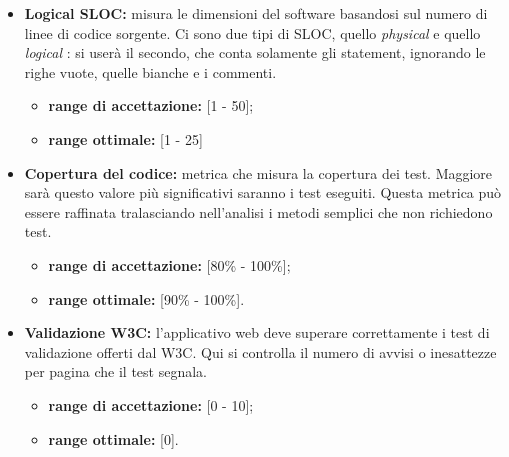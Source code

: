 \begin{itemize}
				\item \textbf{Logical SLOC:} misura le dimensioni del software basandosi sul numero di linee di codice sorgente. Ci sono due tipi di SLOC, quello \textit{physical} e quello \textit{logical} : si userà il secondo, che conta solamente gli statement, ignorando le righe vuote, quelle bianche e i commenti.
				\begin{itemize}
					\item \textbf{range di accettazione:} [1 - 50]; 
					\item \textbf{range ottimale:} [1 - 25]
				\end{itemize}
								
				\item \textbf{Copertura del codice:} metrica che misura la copertura dei test. Maggiore sarà questo valore più significativi saranno i test eseguiti. Questa metrica può essere raffinata tralasciando nell'analisi i metodi semplici che non richiedono test.
				\begin{itemize}
					\item \textbf{range di accettazione:} [80\% - 100\%];
					\item \textbf{range ottimale:} [90\% - 100\%].
				\end{itemize}			
				
				\item \textbf{Validazione W3C:} l'applicativo web deve superare correttamente i test di validazione offerti dal W3C. Qui si controlla il numero di avvisi o inesattezze per pagina che il test segnala.
				\begin{itemize}
					\item \textbf{range di accettazione:} [0 - 10];
					\item \textbf{range ottimale:} [0].
				\end{itemize}				
				
			\end{itemize}
			

	\pagebreak

